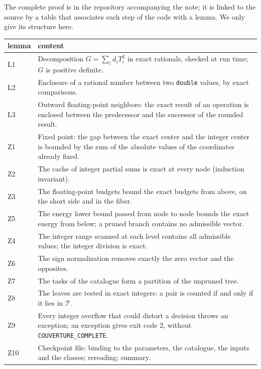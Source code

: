 \documentclass[11pt,a4paper]{amsart}
\theoremstyle{plain}
\theoremstyle{definition}
\numberwithin{equation}{section}
\newcommand{\Tc}{\mathcal{T}}
\begin{document}
The complete proof is in the repository accompanying the note; it is linked to the source by a table that associates each step of the code with a lemma. We only give its structure here.

\begin{center}\small
\begin{tabular}{l>{\raggedright\arraybackslash}p{11.6cm}}
\toprule
lemma & content \\
\midrule
L1 & Decomposition $G=\sum_id_iT_i^2$ in exact rationals, checked at run time; $G$ is positive definite. \\
L2 & Enclosure of a rational number between two \texttt{double} values, by exact comparisons. \\
L3 & Outward floating-point neighbors: the exact result of an operation is enclosed between the predecessor and the successor of the rounded result. \\
Z1 & Fixed point: the gap between the exact center and the integer center is bounded by the sum of the absolute values of the coordinates already fixed. \\
Z2 & The cache of integer partial sums is exact at every node (induction invariant). \\
Z3 & The floating-point budgets bound the exact budgets from above, on the short side and in the fiber. \\
Z5 & The energy lower bound passed from node to node bounds the exact energy from below; a pruned branch contains no admissible vector. \\
Z4 & The integer range scanned at each level contains all admissible values; the integer division is exact. \\
Z6 & The sign normalization removes exactly the zero vector and the opposites. \\
Z7 & The tasks of the catalogue form a partition of the unpruned tree. \\
Z8 & The leaves are tested in exact integers: a pair is counted if and only if it lies in $\Tc$. \\
Z9 & Every integer overflow that could distort a decision throws an exception; an exception gives exit code $2$, without \texttt{COUVERTURE\_COMPLETE}. \\
Z10 & Checkpoint file: binding to the parameters, the catalogue, the inputs and the classes; rereading; summary. \\
\bottomrule
\end{tabular}
\end{center}
\end{document}
